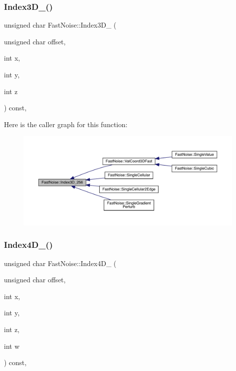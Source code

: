 \subsubsection{\texorpdfstring{Index3\+D\+\_()}{Index3D\_256()}}
{\footnotesize\ttfamily unsigned char Fast\+Noise\+::\+Index3\+D\+\_ (\begin{DoxyParamCaption}\item[{unsigned char}]{offset,  }\item[{int}]{x,  }\item[{int}]{y,  }\item[{int}]{z }\end{DoxyParamCaption}) const\hspace{0.3cm}{\ttfamily [inline]}, {\ttfamily [private]}}

Here is the caller graph for this function\+:
\nopagebreak
\begin{figure}[H]
\begin{center}
\leavevmode
\includegraphics[width=350pt]{class_fast_noise_a1102de0e643266c5ea9b54a5bbca2476_icgraph}
\end{center}
\end{figure}
\mbox{\label{class_fast_noise_a911f18604455d0a36d9203edc0f3387b}} 
\subsubsection{\texorpdfstring{Index4\+D\+\_()}{Index4D\_256()}}
{\footnotesize\ttfamily unsigned char Fast\+Noise\+::\+Index4\+D\+\_ (\begin{DoxyParamCaption}\item[{unsigned char}]{offset,  }\item[{int}]{x,  }\item[{int}]{y,  }\item[{int}]{z,  }\item[{int}]{w }\end{DoxyParamCaption}) const\hspace{0.3cm}{\ttfamily [inline]}, {\ttfamily [private]}}

